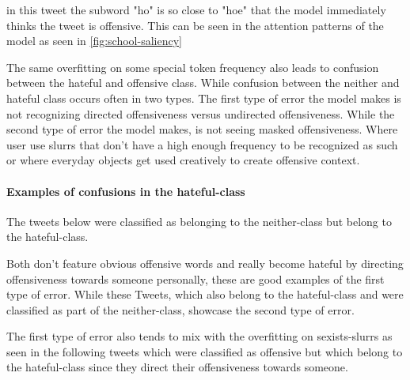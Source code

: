 \documentclass[11pt,a4paper]{article}
\begin{document}
in this tweet the subword "ho" is so close to "hoe" that the model immediately thinks the tweet is offensive.
This can be seen in the attention patterns of the model as seen in \ref{fig:school-saliency}

The same overfitting on some special token frequency also leads to confusion between the hateful and offensive class.
While confusion between the neither and hateful class occurs often in two types.
The first type of error the model makes is not recognizing directed offensiveness versus undirected offensiveness.
While the second type of error the model makes, is not seeing masked offensiveness.
Where user use slurrs that don't have a high enough frequency to be recognized as such 
or where everyday objects get used creatively to create offensive context.

\paragraph{Examples of confusions in the hateful-class}
The tweets below were classified as belonging to the neither-class but belong to the hateful-class.

\begin{center}
  \newline
  \newline
\end{center}

Both don't feature obvious offensive words and really become hateful by directing offensiveness towards someone personally, 
these are good examples of the first type of error.
While these Tweets, which also belong to the hateful-class and were classified as part of the neither-class, showcase the second type of error.
\begin{center}
  \newline
   \newline
   \newline
\end{center}

The first type of error also tends to mix with the overfitting on sexists-slurrs as seen in the following tweets which were classified as offensive
but which belong to the hateful-class since they direct their offensiveness towards someone.
\begin{center}
  \newline
  \newline
  \newline
\end{center}
\end{document}
